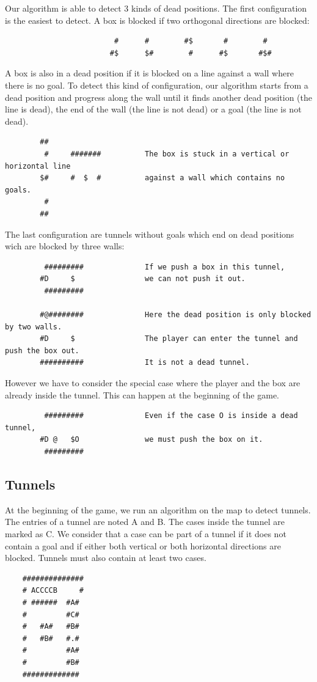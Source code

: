 \documentclass[a4paper,10pt]{article}
\begin{document}
			Our algorithm is able to detect 3 kinds of dead positions.
			The first configuration is the easiest to detect. A box is blocked if two orthogonal directions are blocked:
            \begin{verbatim}
			             #      #        #$       #        #       
			            #$      $#        #      #$       #$# 
			\end{verbatim}

			A box is also in a dead position if it is blocked on a line against a wall where there is no goal.
			To detect this kind of configuration, our algorithm starts from a dead position and progress along the wall until it finds
			another dead position (the line is dead), the end of the wall (the line is not dead) or a goal (the line is not dead).
		\begin{verbatim}
		##           
		 #     #######          The box is stuck in a vertical or horizontal line
		$#     #  $  #          against a wall which contains no goals.
		 #
		##

	    \end{verbatim}

			The last configuration are tunnels without goals which end on dead positions wich are blocked by three walls:
		\begin{verbatim}
		 #########              If we push a box in this tunnel, 
		#D     $                we can not push it out.
		 #########

		#@########              Here the dead position is only blocked by two walls. 
		#D     $                The player can enter the tunnel and push the box out. 
		##########              It is not a dead tunnel.

		\end{verbatim}
 
		However we have to consider the special case where the player and the box are already inside the tunnel. 
		This can happen at the beginning of the game.
		\begin{verbatim}
		 #########              Even if the case O is inside a dead tunnel, 
		#D @   $O               we must push the box on it.
		 #########               
		\end{verbatim}

	\subsection{Tunnels}
	At the beginning of the game, we run an algorithm on the map to detect tunnels.
	The entries of a tunnel are noted A and B. The cases inside the tunnel are marked as C.
	We consider that a case can be part of a tunnel if it does not contain a goal 
	and if either both vertical or both horizontal directions are blocked.
	Tunnels must also contain at least two cases.
	\begin{verbatim}
    ##############
    # ACCCCB     #
    # ######  #A#
    #         #C#
    #   #A#   #B#
    #   #B#   #.#
    #         #A#
    #         #B#
    #############
	\end{verbatim}
\end{document}
